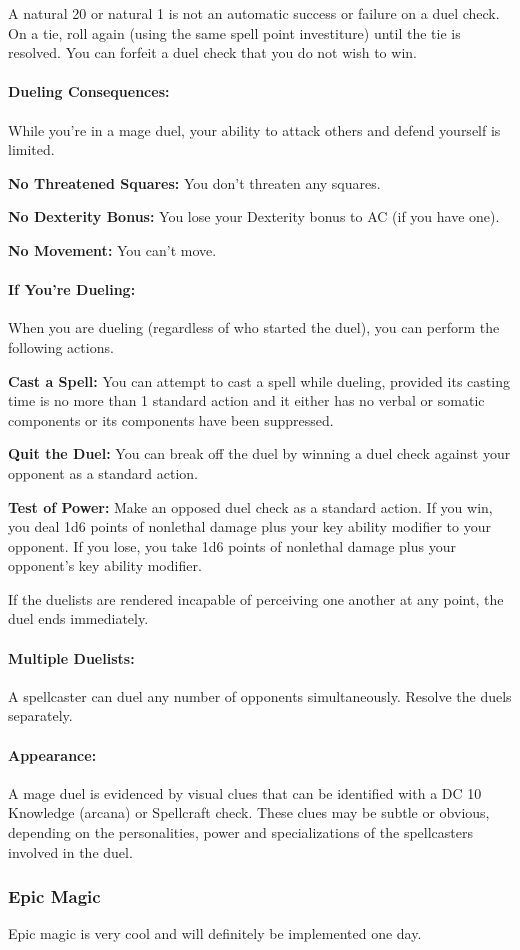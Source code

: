 A natural 20 or natural 1 is not an automatic success or failure on a duel check. On a tie, roll again (using the same spell point investiture) until the tie is resolved. You can forfeit a duel check that you do not wish to win.
\paragraph{Dueling Consequences:} While you're in a mage duel, your ability to attack others and defend yourself is limited.
\begin{list}{}{\leftmargin=1em}
 \item \textbf{No Threatened Squares:} You don't threaten any squares.
 \item \textbf{No Dexterity Bonus:} You lose your Dexterity bonus to AC (if you have one).
 \item \textbf{No Movement:} You can't move.
\end{list}
\paragraph{If You're Dueling:} When you are dueling (regardless of who started the duel), you can perform the following actions.
\begin{list}{}{\leftmargin=1em}
 \item \textbf{Cast a Spell:} You can attempt to cast a spell while dueling, provided its casting time is no more than 1 standard action and it either has no verbal or somatic components or its components have been suppressed.
 \item \textbf{Quit the Duel:} You can break off the duel by winning a duel check against your opponent as a standard action.
 \item \textbf{Test of Power:} Make an opposed duel check as a standard action. If you win, you deal 1d6 points of nonlethal damage plus your key ability modifier to your opponent. If you lose, you take 1d6 points of nonlethal damage plus your opponent's key ability modifier.
\end{list}
If the duelists are rendered incapable of perceiving one another at any point, the duel ends immediately.
\paragraph{Multiple Duelists:} A spellcaster can duel any number of opponents simultaneously. Resolve the duels separately.
\paragraph{Appearance:} A mage duel is evidenced by visual clues that can be identified with a DC 10 Knowledge (arcana) or Spellcraft check. These clues may be subtle or obvious, depending on the personalities, power and specializations of the spellcasters involved in the duel.
\subsubsection{Epic Magic}
Epic magic is very cool and will definitely be implemented one day.